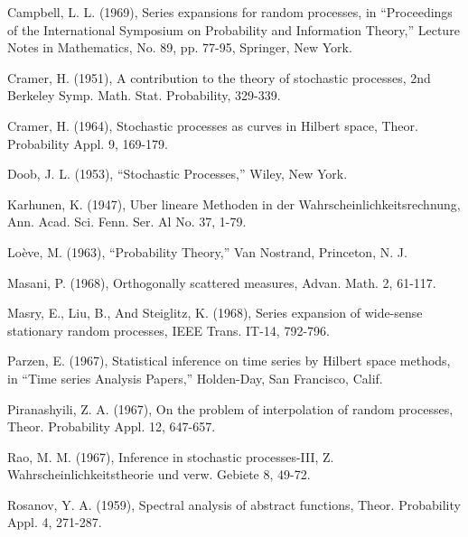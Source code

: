 \documentclass{article}
\begin{document}
\begin{thebibliography}{99}

 Campbell, L. L. (1969), Series expansions for random processes, in ``Proceedings of the International Symposium on Probability and Information Theory,'' Lecture Notes in Mathematics, No. 89, pp. 77-95, Springer, New York.

 Cramer, H. (1951), A contribution to the theory of stochastic processes, 2nd Berkeley Symp. Math. Stat. Probability, 329-339.

 Cramer, H. (1964), Stochastic processes as curves in Hilbert space, Theor. Probability Appl. 9, 169-179.

 Doob, J. L. (1953), ``Stochastic Processes,'' Wiley, New York.

 Karhunen, K. (1947), Uber lineare Methoden in der Wahrscheinlichkeitsrechnung, Ann. Acad. Sci. Fenn. Ser. Al No. 37, 1-79.

 Loève, M. (1963), ``Probability Theory,'' Van Nostrand, Princeton, N. J.

 Masani, P. (1968), Orthogonally scattered measures, Advan. Math. 2, 61-117.

 Masry, E., Liu, B., And Steiglitz, K. (1968), Series expansion of wide-sense stationary random processes, IEEE Trans. IT-14, 792-796.

 Parzen, E. (1967), Statistical inference on time series by Hilbert space methods, in ``Time series Analysis Papers,'' Holden-Day, San Francisco, Calif.

 Piranashyili, Z. A. (1967), On the problem of interpolation of random processes, Theor. Probability Appl. 12, 647-657.

 Rao, M. M. (1967), Inference in stochastic processes-III, Z. Wahrscheinlichkeitstheorie und verw. Gebiete 8, 49-72.

 Rosanov, Y. A. (1959), Spectral analysis of abstract functions, Theor. Probability Appl. 4, 271-287.

\end{thebibliography}
\end{document}
